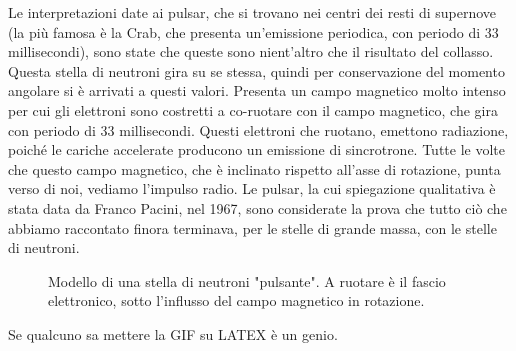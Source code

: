 \documentclass[a4paper,11pt]{article}
\begin{document}
Le interpretazioni date ai pulsar, che si trovano nei centri dei resti di supernove (la più famosa è la Crab, che presenta un'emissione periodica, con periodo di 33 millisecondi), sono state che queste sono nient'altro che il risultato del collasso. Questa stella di neutroni gira su se stessa, quindi per conservazione del momento angolare si è arrivati a questi valori. Presenta un campo magnetico molto intenso per cui gli elettroni sono costretti a co-ruotare con il campo magnetico, che gira con periodo di 33 millisecondi. Questi elettroni che ruotano, emettono radiazione, poiché le cariche accelerate producono un emissione di sincrotrone. Tutte le volte che questo campo magnetico, che è inclinato rispetto all'asse di rotazione, punta verso di noi, vediamo l'impulso radio. Le pulsar, la cui spiegazione qualitativa è stata data da Franco Pacini, nel 1967, sono considerate la prova che tutto ciò che abbiamo raccontato finora terminava, per le stelle di grande massa, con le stelle di neutroni. 
\begin{figure}[h!!]
        \centering
        \caption{Modello di una stella di neutroni "pulsante". A ruotare è il fascio elettronico, sotto l'influsso del campo magnetico in rotazione.}
        \label{lezione 28 novembre/pulsar.gif}
    \end{figure}
    Se qualcuno sa mettere la GIF su LATEX è un genio.
\end{document}
